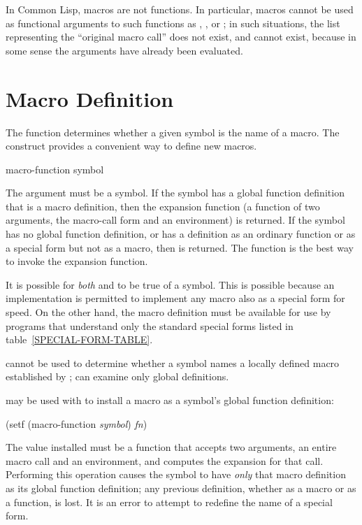 In Common Lisp, macros are not functions.
In particular, macros cannot be used as
functional arguments to such functions as , ,
or ; in such situations, the list representing the ``original macro
call'' does not exist, and cannot exist, because in some sense the arguments
have already been evaluated.


\section{Macro Definition}

The function  determines whether a given symbol
is the name of a macro.  The  construct provides
a convenient way to define new macros.

\begin{obsolete}
\begin{defun}[Function]
macro-function symbol

The argument must be a symbol.  If the symbol has a global function definition
that is a macro definition, then the expansion function
(a function of two arguments, the macro-call form and an environment)
is returned.
If the symbol has no global function definition, or has a definition
as an ordinary function or as a special form but not as a macro, then
{\false} is returned.  The function 
is the best way to invoke the expansion function.

It is possible for {\it both}  and 
to be true of a symbol.  This is possible because an implementation is
permitted to implement any macro also as a special form for speed.
On the other hand, the macro definition must be available
for use by programs that understand only the standard special forms
listed in table~\ref{SPECIAL-FORM-TABLE}.

 cannot be used to determine whether a symbol names
a locally defined macro established by ;
 can
examine only global definitions.

 may be used with  to install
a macro as a symbol's global function definition:
\begin{lisp}
(setf (macro-function {\it symbol}) {\it fn})
\end{lisp}
The value installed must be a function that accepts two arguments,
an entire macro call and an environment, and computes the expansion for that call.
Performing this operation causes the symbol to have {\it only} that
macro definition as its global function definition; any previous
definition, whether as a macro or as a function, is lost.
It is an error to attempt to redefine the name of a special
form.
\end{defun}
\end{obsolete}

